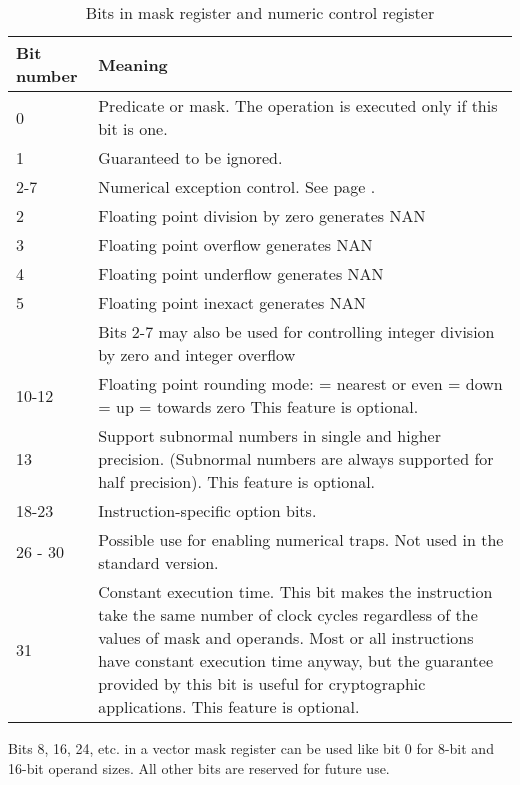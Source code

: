 \documentclass[forwardcom.tex]{subfiles}
\begin{document}
\begin{longtable}
{|p{15mm}|p{90mm}|}
\caption{Bits in mask register and numeric control register}
\label{table:maskBits}
\endfirsthead
\endhead
\hline
\bfseries Bit number & \bfseries Meaning \\
 \hline
0 & Predicate or mask. The operation is executed only if this bit is one.\\
1 & Guaranteed to be ignored. \\
\hline
2-7 & Numerical exception control. See page \pageref{table:FPExceptionResults}. \\
2 & Floating point division by zero generates NAN \\
3 & Floating point overflow generates NAN \\
4 & Floating point underflow generates NAN \\
5 & Floating point inexact generates NAN \\
  & Bits 2-7 may also be used for controlling integer division by zero and integer overflow \\ \hline
10-12 & Floating point rounding mode: \newline
000 = nearest or even \newline
001 = down \newline
010 = up \newline
011 = towards zero \newline
This feature is optional.\\ \hline
13 & Support subnormal numbers in single and higher precision. 
(Subnormal numbers are always supported for half precision). This feature is optional.\\ \hline  
  
18-23 & Instruction-specific option bits.\\
\hline
26 - 30 & Possible use for enabling numerical traps. Not used in the standard version. \\
\hline
31 & Constant execution time. This bit makes the instruction take the same number of clock cycles
regardless of the values of mask and operands. Most or all instructions have constant execution time anyway, but the guarantee provided by this bit is useful for cryptographic applications. This feature is optional. \\
\hline
\end{longtable}

Bits 8, 16, 24, etc. in a vector mask register can be used like bit 0 for 8-bit and 16-bit operand sizes. All other bits are reserved for future use.
\vspace{2mm}
\end{document}
